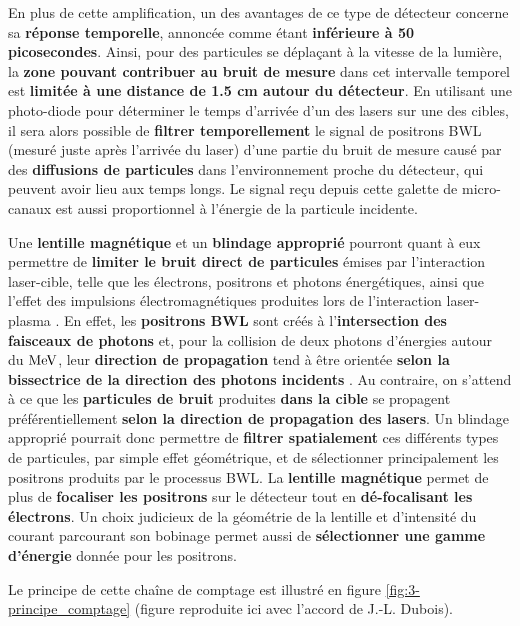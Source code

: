 \begin{refsection}
En plus de cette amplification, un des avantages de ce type de détecteur concerne sa \textbf{réponse temporelle}, annoncée comme étant \textbf{inférieure à 50 picosecondes}. Ainsi, pour des particules se déplaçant à la vitesse de la lumière, la \textbf{zone pouvant contribuer au bruit de mesure} dans cet intervalle temporel est \textbf{limitée à une distance de 1.5 cm autour du détecteur}. En utilisant une photo-diode pour déterminer le temps d'arrivée d'un des lasers sur une des cibles, il sera alors possible de \textbf{filtrer temporellement} le signal de positrons BWL (mesuré juste après l'arrivée du laser) d'une partie du bruit de mesure causé par des \textbf{diffusions de particules} dans l'environnement proche du détecteur, qui peuvent avoir lieu aux temps longs. Le signal reçu depuis cette galette de micro-canaux est aussi proportionnel à l'énergie de la particule incidente.

Une \textbf{lentille magnétique} et un \textbf{blindage approprié} pourront quant à eux permettre de \textbf{limiter le bruit direct de particules} émises par l'interaction laser-cible, telle que les électrons, positrons et photons énergétiques, ainsi que l'effet des impulsions électromagnétiques produites lors de l'interaction laser-plasma \parencite{poye_2015}. En effet, les \textbf{positrons BWL} sont créés à l'\textbf{intersection des faisceaux de photons} et, pour la collision de deux photons d'énergies autour du $\rm MeV$, leur \textbf{direction de propagation} tend à être orientée \textbf{selon la bissectrice de la direction des photons incidents} \parencite{ribeyre_2017}. Au contraire, on s'attend à ce que les \textbf{particules de bruit} produites \textbf{dans la cible} se propagent préférentiellement \textbf{selon la direction de propagation des lasers}. Un blindage approprié pourrait donc permettre de \textbf{filtrer spatialement} ces différents types de particules, par simple effet géométrique, et de sélectionner principalement les positrons produits par le processus BWL. La \textbf{lentille magnétique} permet de plus de \textbf{focaliser les positrons} sur le détecteur tout en \textbf{dé-focalisant les électrons}. Un choix judicieux de la géométrie de la lentille et d'intensité du courant parcourant son bobinage permet aussi de \textbf{sélectionner une gamme d'énergie} donnée pour les positrons.

Le principe de cette chaîne de comptage est illustré en figure \ref{fig:3-principe_comptage} (figure reproduite ici avec l'accord de J.-L. Dubois).


\end{refsection}

